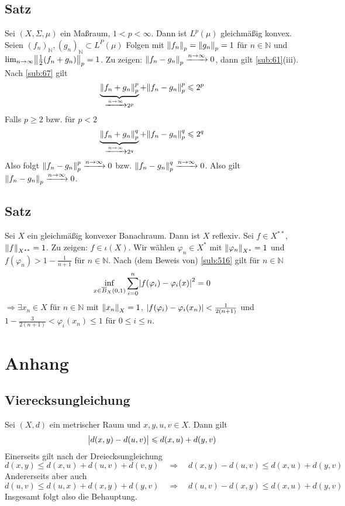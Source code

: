 \subsection[Satz: Für $1 <p <\infty$ ist $L^p(\mu)$ gleichmäßig konvex]{Satz} %
\label{sub:68}
Sei $(X,\Sigma,\mu)$ ein Maßraum, $1 <p < \infty$. Dann ist $L^p(\mu)$ gleichmäßig konvex.
Seien $(f_n)_\mathds{N}, (g_n)_\mathds{N} \subset L^P(\mu)$ Folgen mit $\norm[p]{f_n}= \norm[p]{g_n}= 1 $ für $n \in \mathds{N}$ und 
$\lim_{ n \to \infty} \norm[p]{\frac{1}{2} (f_n+g_n)}=1$. Zu zeigen: $\norm[p]{f_n-g_n} \xrightarrow{n \to \infty} 0$, dann gilt \ref{sub:61}(iii). Nach \ref{sub:67}
gilt 
\[
	\underbrace{\norm[p]{f_n+g_n}^p}_{\xrightarrow{n \to \infty} 2^p} + \norm[p]{f_n-g_n}^p \le 2^{p} 
\]
Falls $p\ge 2$ bzw. für $p < 2$
\[
	\underbrace{\norm[p]{f_n+g_n}^q }_{\xrightarrow{n \to \infty} 2^q}+ \norm[p]{f_n-g_n}^q \le 2^q
\]
Also folgt $\norm[p]{f_n -g_n}^p \xrightarrow{n \to \infty} 0$ bzw. $\norm[p]{f_n-g_n}^q \xrightarrow{n \to \infty} 0$. Also gilt 
$\norm[p]{f_n -g_n} \xrightarrow{n \to \infty} 0$. \bewende

\subsection{Satz} %
\label{sub:69}
Sei $X$ ein gleichmäßig konvexer Banachraum. Dann ist $X$ reflexiv.
Sei $f \in X^{**}$, $\norm[X^{**}]{f}=1$. Zu zeigen: $f \in \iota(X)$. Wir wählen $\varphi_n \in X^*$ mit $\norm[X^*]{\varphi_n}=1$ und $f(\varphi_n) > 1- \frac{1}{n+1}$
für $n \in \mathds{N}$. Nach (dem Beweis von) \ref{sub:516} gilt für $n \in \mathds{N}$
\[
	\inf_{x \in \overline{B}_X(0,1) } \sum_{i=0}^{n} \abs*{f(\varphi_i) - \varphi_i(x)}^2 =0
\]
$\Rightarrow \exists x_n \in X$ für $n \in \mathds{N}$ mit $\norm[X]{x_n}=1$, $\abs*{f(\varphi_i)- \varphi_i(x_n)} < \frac{1}{2(n+1)}$ und
$1- \frac{3}{2(n+1)}< \varphi_i(x_n) \le 1$ für $0 \le i \le n$.



\cleardoubleoddemptypage
\appendix
\section{Anhang} %
\label{sec:anhang}

\subsection{Vierecksungleichung} %
\label{sub:vier_ungl}
Sei $(X,d)$ ein metrischer Raum und $x,y,u,v \in X$. Dann gilt
\[
	\abs[\big]{d(x,y) - d(u,v)} \le d(x,u) + d(y,v) 
\]
Einerseits gilt nach der Dreiecksungleichung
\[
	d(x,y) \le d(x,u) + d(u,v) + d(v,y) \quad \Longrightarrow \quad d(x,y) - d(u,v) \le d(x,u) + d(y,v)
\]
Andererseits aber auch
\[
	d(u,v) \le d(u,x) + d(x,y) + d(y,v) \quad \Longrightarrow \quad d(u,v) - d(x,y) \le d(x,u) + d(y,v)
\]
Insgesamt folgt also die Behauptung. \bewende

\cleardoubleoddemptypage
{}
\setcounter{page}{1}
\printindex
\listoffigures
\todototoc
{}
